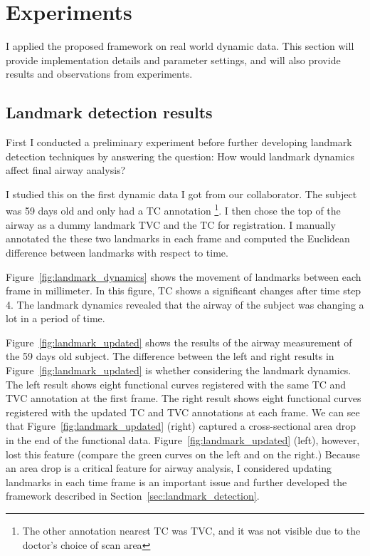 \section{Experiments}
\label{sec:experiments}
I applied the proposed framework on real world dynamic data.
This section will provide implementation details and parameter settings, and will also provide results and observations from experiments.

\subsection{Landmark detection results}
\label{sec:landmark_detection_results}
First I conducted a preliminary experiment before further developing landmark detection techniques by answering the question: How would landmark dynamics affect final airway analysis?

I studied this on the first dynamic data I got from our collaborator.
The subject was 59 days old and only had a TC annotation \footnote{The other annotation nearest TC was TVC, and it was not visible due to the doctor's choice of scan area}. 
I then chose the top of the airway as a dummy landmark TVC and the TC for registration.
I manually annotated the these two landmarks in each frame and computed the Euclidean difference between landmarks with respect to time.

Figure~\ref{fig:landmark_dynamics} shows the movement of landmarks between each frame in millimeter.
In this figure, TC shows a significant changes after time step 4.
The landmark dynamics revealed that the airway of the subject was changing a lot in a period of time.

Figure~\ref{fig:landmark_updated} shows the results of the airway measurement of the 59 days old subject.
The difference between the left and right results in Figure~\ref{fig:landmark_updated} is whether considering the landmark dynamics.
The left result shows eight functional curves registered with the same TC and TVC annotation at the first frame.
The right result shows eight functional curves registered with the updated TC and TVC annotations at each frame.
We can see that Figure~\ref{fig:landmark_updated} (right) captured a cross-sectional area drop in the end of the functional data.
Figure~\ref{fig:landmark_updated} (left), however, lost this feature (compare the green curves on the left and on the right.)
Because an area drop is a critical feature for airway analysis, I considered updating landmarks in each time frame is an important issue and further developed the framework described in Section~\ref{sec:landmark_detection}.

